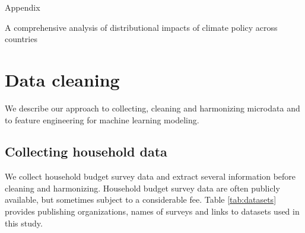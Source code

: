 \documentclass[12pt, a4paper]{article}
\begin{document}
\clearpage

\begin{refcontext}[sorting=nyt]
\printbibliography
\end{refcontext}

\clearpage

\appendix 
\begin{refsection}
{\Huge Appendix} \label{sec:appendix}

A comprehensive analysis of distributional impacts of climate policy across countries

\clearpage
\section{Data cleaning} \label{sec:cleaning}

We describe our approach to collecting, cleaning and harmonizing microdata and to feature engineering for machine learning modeling.

\subsection{Collecting household data}

We collect household budget survey data and extract several information before cleaning and harmonizing. Household budget survey data are often publicly available, but sometimes subject to a considerable fee. Table \ref{tab:datasets} provides publishing organizations, names of surveys and links to datasets used in this study.


\end{refsection}
\end{document}
